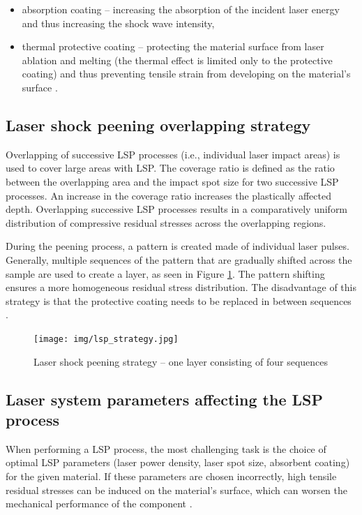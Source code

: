 \begin{itemize}
    \item absorption coating -- increasing the absorption of the incident laser energy and thus increasing the shock wave intensity,
    \item thermal protective coating -- protecting the material surface from laser ablation and melting (the thermal effect is limited only to the protective coating) and thus preventing tensile strain from developing on the material's surface \cite{hong_wang_guo_wu_wang_dai_xia_xie_1998}.
\end{itemize}

\subsection{Laser shock peening overlapping strategy}

Overlapping of successive LSP processes (i.e., individual laser impact areas) is used to cover large areas with LSP. The coverage ratio is defined as the ratio between the overlapping area and the impact spot size for two successive LSP processes. An increase in the coverage ratio increases the plastically affected depth. Overlapping successive LSP processes results in a comparatively uniform distribution of compressive residual stresses across the overlapping regions.

During the peening process, a pattern is created made of individual laser pulses. Generally, multiple sequences of the pattern that are gradually shifted across the sample are used to create a layer, as seen in Figure \ref{fig:lspstrategy}. The pattern shifting ensures a more homogeneous residual stress distribution. The disadvantage of this strategy is that the protective coating needs to be replaced in between sequences \cite{kaufman}.

\begin{figure}[h]
    \centering
    \texttt{[image: img/lsp\_strategy.jpg]}
    \caption{Laser shock peening strategy -- one layer consisting of four sequences \protect\cite{bohm_kaufman_brajer_rostohar_2019}}
    \label{fig:lspstrategy}
\end{figure}



\subsection{Laser system parameters affecting the LSP process}

When performing a LSP process, the most challenging task is the choice of optimal LSP parameters (laser power density, laser spot size, absorbent coating) for the given material. If these parameters are chosen incorrectly, high tensile residual stresses can be induced on the material's surface, which can worsen the mechanical performance of the component \cite{clauer_holbrook_fairand_1981}.  

